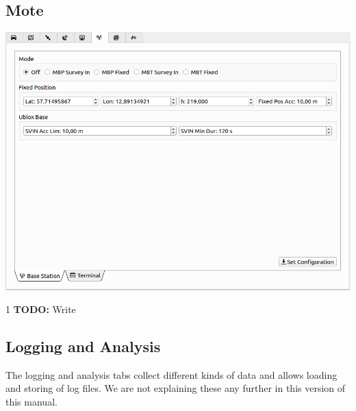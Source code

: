 \documentclass[12pt]{article} %
\def\printtodos{0}
\newcommand{\todo}[1]{
  \if\printtodos1
      {\color{red} \textbf{TODO:} #1}
  \fi}
\begin{document}
\subsection{Mote}
\noindent\begin{minipage}{0.5\linewidth}
\noindent \includegraphics[width=\textwidth]{./screens/mote.png}
\end{minipage}
\begin{minipage}{0.5\linewidth}
  \todo{Write}
\end{minipage}



\subsection{Logging and Analysis}
The logging and analysis tabs collect different kinds of data and
allows loading and storing of log files. We are not explaining these
any further in this version of this manual.
\end{document}
